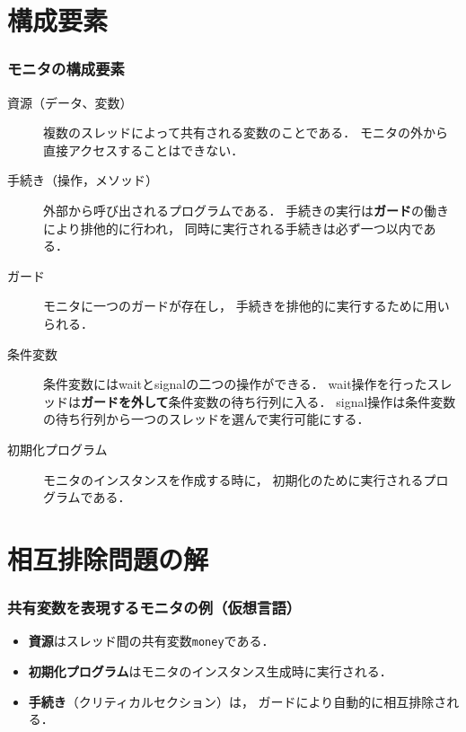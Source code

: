 \documentclass{beamer}                   %
\begin{document}
\section{構成要素}
\begin{frame}
  \frametitle{モニタの構成要素}
\begin{description}
\item [資源（データ、変数）]
複数のスレッドによって共有される変数のことである．
モニタの外から直接アクセスすることはできない．

\item [手続き（操作，メソッド）]
外部から呼び出されるプログラムである．
手続きの実行は{\bf ガード}の働きにより排他的に行われ，
同時に実行される手続きは必ず一つ以内である．

\item [ガード]
モニタに一つのガードが存在し，
手続きを排他的に実行するために用いられる．

\item [条件変数]
条件変数にはwaitとsignalの二つの操作ができる．
wait操作を行ったスレッドは{\bf ガードを外して}条件変数の待ち行列に入る．
signal操作は条件変数の待ち行列から一つのスレッドを選んで実行可能にする．

\item [初期化プログラム]
モニタのインスタンスを作成する時に，
初期化のために実行されるプログラムである．
\end{description}
\end{frame}

\section{相互排除問題の解}
\begin{frame}
  \frametitle{共有変数を表現するモニタの例（仮想言語）}

  \begin{itemize}
  \item {\bf 資源}はスレッド間の共有変数{\tt money}である．
  \item {\bf 初期化プログラム}はモニタのインスタンス生成時に実行される．
  \item {\bf 手続き}（クリティカルセクション）は，
    ガードにより自動的に相互排除される．
  \end{itemize}
\end{frame}
\end{document}
